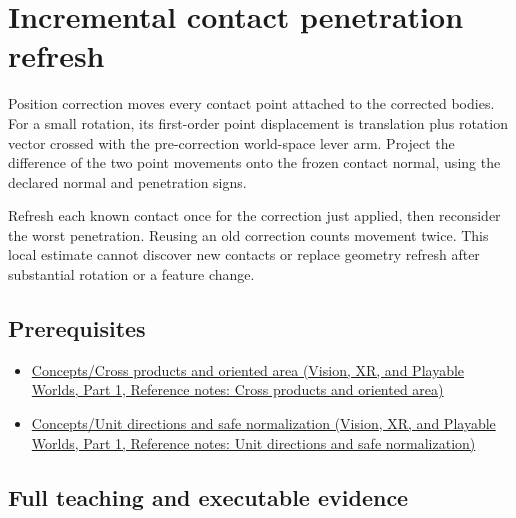 \hypertarget{appendix-f682275acbdf}{}\label{referencestart:appendix-f682275acbdf}
\section{Incremental contact penetration refresh}\label{appendix-f682275acbdf-incremental-contact-penetration-refresh}

\hypertarget{appendix-f682275acbdf-incremental-contact-penetration-refresh}{}

Position correction moves every contact point attached to the corrected bodies. For a small rotation, its first-order point displacement is translation plus rotation vector crossed with the pre-correction world-space lever arm. Project the difference of the two point movements onto the frozen contact normal, using the declared normal and penetration signs.

Refresh each known contact once for the correction just applied, then reconsider the worst penetration. Reusing an old correction counts movement twice. This local estimate cannot discover new contacts or replace geometry refresh after substantial rotation or a feature change.

\subsection{Prerequisites}\label{appendix-f682275acbdf-prerequisites}

\hypertarget{appendix-f682275acbdf-prerequisites}{}

\begin{itemize}
\tightlist
\item
  \href{../07-Vision-XR-and-Playable-Worlds-P01/main.pdf\#nameddest=appendix-2391db8052b1}{Concepts/Cross products and oriented area (Vision, XR, and Playable Worlds, Part 1, Reference notes: Cross products and oriented area)}
\item
  \href{../07-Vision-XR-and-Playable-Worlds-P01/main.pdf\#nameddest=appendix-f744e41b95b4}{Concepts/Unit directions and safe normalization (Vision, XR, and Playable Worlds, Part 1, Reference notes: Unit directions and safe normalization)}
\end{itemize}

\subsection{Full teaching and executable evidence}\label{appendix-f682275acbdf-full-teaching-and-executable-evidence}

